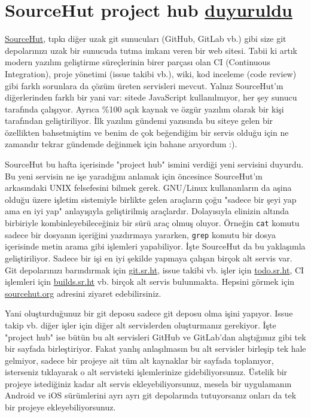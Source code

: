 \documentclass[11pt]{article}
\begin{document}
\section{SourceHut project hub \href{https://sourcehut.org/blog/2020-04-30-the-sourcehut-hub-is-live/}{duyuruldu}}
\label{sec:orgc27168d}
\href{https://sourcehut.org}{SourceHut}, tıpkı diğer uzak git sunucuları (GitHub, GitLab vb.) gibi size git
depolarınızı uzak bir sunucuda tutma imkanı veren bir web sitesi. Tabii ki
artık modern yazılım geliştirme süreçlerinin birer parçası olan CI (Continuous
Integration), proje yönetimi (issue takibi vb.), wiki, kod inceleme (code
review) gibi farklı sorunlara da çözüm üreten servisleri mevcut. Yalnız
SourceHut'ın diğerlerinden farklı bir yani var: sitede JavaScript
kullanılmıyor, her şey sunucu tarafında çalışıyor. Ayrıca \%100 açık kaynak ve
özgür yazılım olarak bir kişi tarafından geliştiriliyor. İlk yazılım gündemi
yazısında bu siteye gelen bir özellikten bahsetmiştim ve benim de çok
beğendiğim bir servis olduğu için ne zamandır tekrar gündemde değinmek için
bahane arıyordum :).

SourceHut bu hafta içerisinde "project hub" ismini verdiği yeni servisini
duyurdu. Bu yeni servisin ne işe yaradığını anlamak için öncesince
SourceHut'ın arkasındaki UNIX felsefesini bilmek gerek. GNU/Linux
kullananların da aşina olduğu üzere işletim sistemiyle birlikte gelen
araçların çoğu "sadece bir şeyi yap ama en iyi yap" anlayışıyla geliştirilmiş
araçlardır. Dolayısıyla elinizin altında birbiriyle kombinleyebileceğiniz bir
sürü araç olmuş oluyor. Örneğin \texttt{cat} komutu sadece bir dosyanın içeriğini
yazdırmaya yararken, \texttt{grep} komutu bir dosya içerisinde metin arama gibi
işlemleri yapabiliyor. İşte SourceHut da bu yaklaşımla geliştiriliyor. Sadece
bir işi en iyi şekilde yapmaya çalışan birçok alt servis var. Git depolarınızı
barındırmak için \href{https://git.sr.ht}{git.sr.ht}, issue takibi vb. işler için \href{https://todo.sr.ht}{todo.sr.ht}, CI
işlemleri için \href{https://builds.sr.ht}{builds.sr.ht} vb. birçok alt servis bulunmakta. Hepsini görmek
için \href{https://sourcehut.org}{sourcehut.org} adresini ziyaret edebilirsiniz.

Yani oluşturduğunuz bir git deposu sadece git deposu olma işini yapıyor. Issue
takip vb. diğer işler için diğer alt servislerden oluşturmanız gerekiyor. İşte
"project hub" ise bütün bu alt servisleri GitHub ve GitLab'dan alıştığımız
gibi tek bir sayfada birleştiriyor. Fakat yanlış anlaşılmasın bu alt servisler
birleşip tek hale gelmiyor, sadece bir projeye ait tüm alt kaynaklar bir
sayfada toplanıyor, isterseniz tıklayarak o alt servisteki işlemlerinize
gidebiliyorsunuz. Üstelik bir projeye istediğiniz kadar alt servis
ekleyebiliyorsunuz, mesela bir uygulamanın Android ve iOS sürümlerini ayrı
ayrı git depolarında tutuyorsanız onları da tek bir projeye
ekleyebiliyorsunuz.
\end{document}
